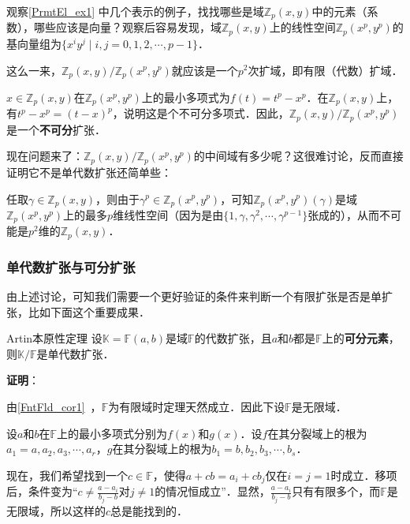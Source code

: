 观察\autoref{PrmtEl_ex1} 中几个表示的例子，找找哪些是域$\mathbb{Z}_p(x, y)$中的元素（系数），哪些应该是向量？观察后容易发现，域$\mathbb{Z}_p(x, y)$上的线性空间$\mathbb{Z}_p(x^p, y^p)$的基向量组为$\{x^iy^j\mid i, j=0, 1, 2, \cdots, p-1\}$．

这么一来，$\mathbb{Z}_p(x, y)/\mathbb{Z}_p(x^p, y^p)$就应该是一个$p^2$次扩域，即有限（代数）扩域．

$x\in\mathbb{Z}_p(x, y)$在$\mathbb{Z}_p(x^p, y^p)$上的最小多项式为$f(t)=t^p-x^p$．在$\mathbb{Z}_p(x, y)$上，有$t^p-x^p=(t-x)^p$，说明这是个不可分多项式．因此，$\mathbb{Z}_p(x, y)/\mathbb{Z}_p(x^p, y^p)$是一个\textbf{不可分}扩张．

现在问题来了：$\mathbb{Z}_p(x, y)/\mathbb{Z}_p(x^p, y^p)$的中间域有多少呢？这很难讨论，反而直接证明它不是单代数扩张还简单些：

任取$\gamma\in\mathbb{Z}_p(x, y)$，则由于$\gamma^p\in\mathbb{Z}_p(x^p, y^p)$，可知$\mathbb{Z}_p(x^p, y^p)(\gamma)$是域$\mathbb{Z}_p(x^p, y^p)$上的最多$p$维线性空间（因为是由$\{1,\gamma, \gamma^2, \cdots, \gamma^{p-1}\}$张成的），从而不可能是$p^2$维的$\mathbb{Z}_p(x, y)$．






\subsubsection{单代数扩张与可分扩张}

由上述讨论，可知我们需要一个更好验证的条件来判断一个有限扩张是否是单扩张，比如下面这个重要成果．

\begin{theorem}{Artin本原性定理}\label{PrmtEl_the2}
设$\mathbb{K}=\mathbb{F}(a, b)$是域$\mathbb{F}$的代数扩张，且$a$和$b$都是$\mathbb{F}$上的\textbf{可分元素}，则$\mathbb{K}/\mathbb{F}$是单代数扩张．
\end{theorem}

\textbf{证明}：

由\autoref{FntFld_cor1}~，$\mathbb{F}$为有限域时定理天然成立．因此下设$\mathbb{F}$是无限域．

设$a$和$b$在$\mathbb{F}$上的最小多项式分别为$f(x)$和$g(x)$．设$f$在其分裂域上的根为$a_1=a, a_2, a_3, \cdots, a_r$，$g$在其分裂域上的根为$b_1=b, b_2, b_3, \cdots, b_s$．

现在，我们希望找到一个$c\in\mathbb{F}$，使得$a+cb=a_i+cb_j$仅在$i=j=1$时成立．移项后，条件变为“$c\neq\frac{a-a_i}{b_j-b}$对$j\neq 1$的情况恒成立”．显然，$\frac{a-a_i}{b_j-b}$只有有限多个，而$\mathbb{F}$是无限域，所以这样的$c$总是能找到的．

